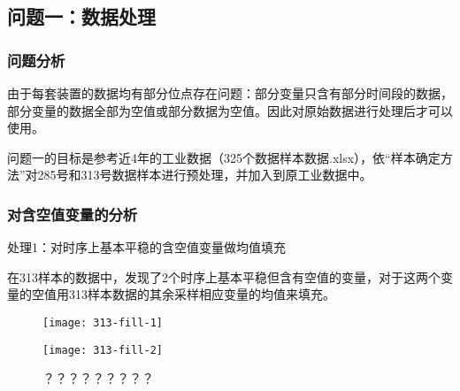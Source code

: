 \documentclass[bwprint]{gmcmthesis}
\begin{document}
\subsection{问题一：数据处理}

\FloatBarrier
\subsubsection{问题分析}

由于每套装置的数据均有部分位点存在问题：部分变量只含有部分时间段的数据，部分变量的数据全部为空值或部分数据为空值。因此对原始数据进行处理后才可以使用。

问题一的目标是参考近4年的工业数据（325个数据样本数据.xlsx），依“样本确定方法”对285号和313号数据样本进行预处理，并加入到原工业数据中。

\FloatBarrier
\subsubsection{对含空值变量的分析}

处理1：对时序上基本平稳的含空值变量做均值填充

在313样本的数据中，发现了2个时序上基本平稳但含有空值的变量，对于这两个变量的空值用313样本数据的其余采样相应变量的均值来填充。


\begin{figure}[htb]
    \centering
    \begin{minipage}[c]{0.48\textwidth}
        \centering
        \texttt{[image: 313-fill-1]}
    \end{minipage}
    \begin{minipage}[c]{0.48\textwidth}
        \centering
        \texttt{[image: 313-fill-2]}
    \end{minipage}
    \caption{？？？？？？？？？}
\end{figure}





\end{document}
